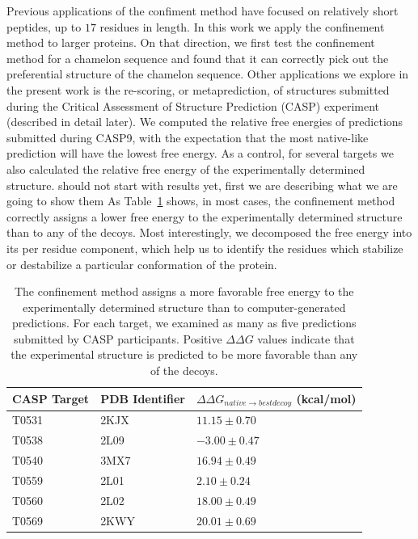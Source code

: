 \documentclass[12pt]{article}
\newcommand{\Alberto}[1]{\color{ForestGreen}#1\normalcolor }
\begin{document}
Previous applications of the confiment method have focused on relatively short peptides, up to $17$
residues in length. In this work we apply the confinement method to
larger proteins. On that direction, we first test the confinement method for a chamelon sequence and 
found that it can correctly pick out the preferential structure of the chamelon sequence. Other 
applications we explore in the present work is the re-scoring, or
metaprediction, of structures submitted during the Critical Assessment of Structure Prediction
(CASP) experiment (described in detail later). We computed the relative free energies of predictions
submitted during CASP9, with the expectation that the most native-like prediction will have
the lowest free energy. As a control, for several targets we also calculated the relative free
energy of the experimentally determined structure. \Alberto{should not start with results yet, first
we are describing what we are going to show them} As
Table~\ref{table:casp_control} shows, in most cases, the confinement method correctly assigns a
lower free energy to the experimentally determined structure than to any of the decoys. 
Most interestingly, we decomposed the free energy into its per residue component, which help 
us to identify the residues which stabilize or destabilize a particular conformation of the protein.

\begin{table}
\begin{center}
\caption{The confinement method assigns a more favorable free energy to the experimentally
determined structure than to computer-generated predictions. For each target, we examined as many as
five predictions submitted by CASP participants. Positive $\Delta\Delta G$ values indicate that the
experimental structure is predicted to be more favorable than any of the decoys.}
\label{table:casp_control}
\begin{tabular}{l l l}\hline
    CASP Target  & PDB Identifier & $\Delta\Delta G_{native \to best decoy}$ (kcal/mol) \\ \hline
     T0531       &    2KJX        &          $11.15 \pm 0.70$ \\ \hline
     T0538       &    2L09        &          $-3.00 \pm 0.47$ \\ \hline
     T0540       &    3MX7        &          $16.94 \pm 0.49$ \\ \hline
     T0559       &    2L01        &          $2.10 \pm 0.24$ \\ \hline
     T0560       &    2L02        &          $18.00 \pm 0.49$ \\ \hline
     T0569       &    2KWY        &          $20.01 \pm 0.69$  \\ \hline
\end{tabular}
\end{center}

\end{table}
\end{document}
